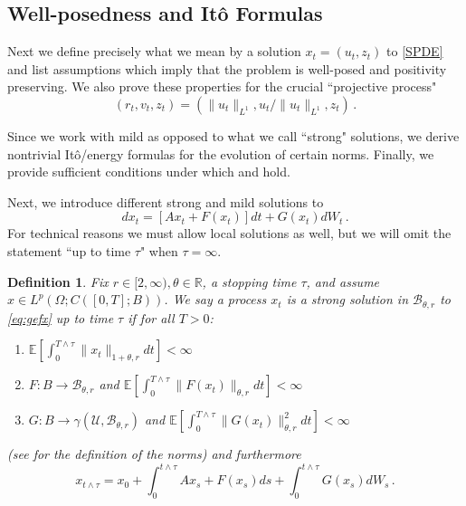 \documentclass[final]{amsart}
\newtheorem{deff}[thm]{Definition}
\numberwithin{thm}{section}
\numberwithin{equation}{section}
\newcommand{\E}{\mathbb{E}}
\newcommand{\U}{\mathcal{U}}
\newcommand{\R}{\mathbb{R}}
\newcommand{\B}{\mathcal{B}}
\begin{document}
\subsection{Well-posedness and It\^{o} Formulas}\label{sec:spde-well-posed}
Next we define precisely what we mean by a solution $x_t = (u_t,z_t)$ to \eqref{SPDE} and list assumptions which imply that the problem is well-posed and positivity preserving. We also prove these properties for the crucial ``projective process" 
 \begin{equation}\label{eq:proj-process-first-def}
 (r_t,v_t,z_t) = 
 (\|u_t\|_{L^1}, u_t/\|u_t\|_{L^1},z_t) \,.
\end{equation}

Since  we work with mild as opposed to what we call ``strong" solutions, we derive nontrivial It\^{o}/energy formulas for the evolution of certain norms. Finally, we provide sufficient conditions under which  and  hold.

Next, we introduce different strong and mild solutions to 
\begin{equation}\label{eq:gefx}
   dx_t = [Ax_t + F(x_t)]dt + G(x_t)dW_t \,. 
\end{equation}
For technical reasons we must allow local solutions as well, but we will omit the statement ``up to time $\tau$" when $\tau = \infty$.


\begin{deff}\label{def:strong}
Fix $r \in [2,\infty), \theta \in \R$, a stopping time $\tau$, and assume $x \in L^p(\Omega;C([0,T];B))$. 
   We say a process $x_t$ is a strong solution in $\B_{\theta,r}$ to \eqref{eq:gefx} up to time $\tau$
    if for all $T > 0$:
    \begin{enumerate}[label=(\roman*)]
        \item $\E[\int_0^{T\wedge \tau} \|x_t\|_{1+\theta, r} dt] < \infty$
        \item $F: B \to \B_{\theta, r}$ and $\E[\int_0^{T\wedge \tau} \|F(x_t)\|_{\theta,r} dt] < \infty$
        \item $G: B \to \gamma(\U,\B_{\theta, r})$ and $\E[\int_0^{T\wedge\tau} \|G(x_t)\|_{\theta,r}^2dt] < \infty$
    \end{enumerate}
    (see  for the definition of the norms) and furthermore
    \begin{equation}\label{eq:seqcn}
    x_{t \wedge \tau} = x_0 + \int_0^{t \wedge \tau} Ax_s + F(x_s)ds + \int_0^{t \wedge \tau} G(x_s)dW_s \,.    
    \end{equation}
\end{deff}
\end{document}
